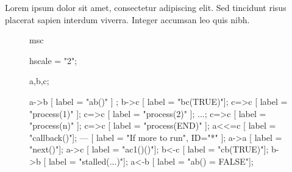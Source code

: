 \documentclass[11pt]{article}
\begin{document}
Lorem ipsum dolor sit amet, consectetur adipiscing elit. Sed tincidunt risus placerat sapien interdum viverra. Integer accumsan leo quis nibh.

\begin{figure}[htb]
\begin{center}
\begin{msc}
msc {
  hscale = "2";

  a,b,c;

  a->b [ label = "ab()" ] ;
  b->c [ label = "bc(TRUE)"];
  c=>c [ label = "process(1)" ];
  c=>c [ label = "process(2)" ];
  ...;
  c=>c [ label = "process(n)" ];
  c=>c [ label = "process(END)" ];
  a<<=c [ label = "callback()"];
  ---  [ label = "If more to run", ID="*" ];
  a->a [ label = "next()"];
  a->c [ label = "ac1()()"];
  b<-c [ label = "cb(TRUE)"];
  b->b [ label = "stalled(...)"];
  a<-b [ label = "ab() = FALSE"];
}
\end{msc}
\end{center}
\end{figure}
\end{document}
